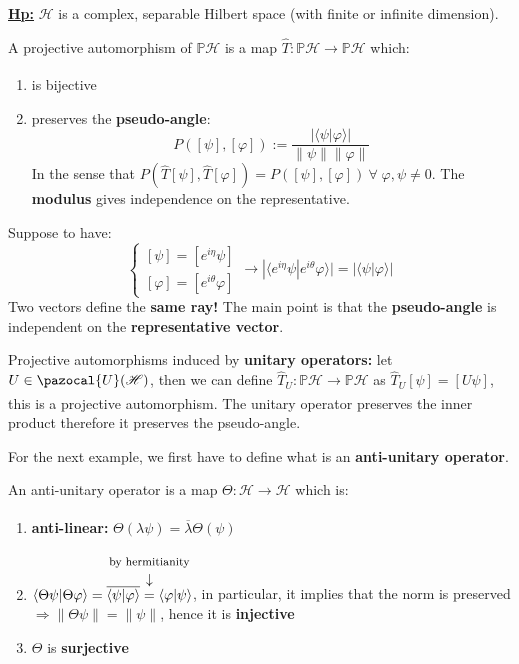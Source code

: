 \documentclass[../main.tex]{subfiles}
\begin{document}
\underline{\textbf{Hp:}} $\mathcal{H}$ is a complex, separable Hilbert space (with finite or infinite dimension).
\begin{definition}
A projective automorphism of $\mathbb{P}\mathcal{H}$ is a map $\hat{T}:\mathbb{P}\mathcal{H}\xrightarrow[]{}\mathbb{P}\mathcal{H}$ which:
\begin{enumerate}
    \item is bijective
    \item preserves the \textbf{pseudo-angle}:
    \[
    P([\psi],[\varphi]):=\frac{|\langle\psi|\varphi\rangle|}{\lVert\psi\rVert\lVert\varphi\rVert}
    \]
    In the sense that $P(\hat{T}[\psi],\hat{T}[\varphi])=P([\psi],[\varphi]) \ \forall\;\varphi,\psi\neq 0$. The \textbf{modulus} gives independence on the representative.
\end{enumerate}
\end{definition}
Suppose to have:
\[
\begin{cases}[\psi]=[e^{i\eta}\psi]\\
[\varphi]=[e^{i\theta}\varphi]
\end{cases}\xrightarrow[]{}|\langle e^{i\eta}\psi|e^{i\theta}\varphi\rangle|=|\langle\psi|\varphi\rangle|
\]
{\selectfont{}\relax}Two vectors define the \textbf{same ray!} The main point is that the \textbf{pseudo-angle} is independent on the \textbf{representative vector}.
\begin{example}
Projective automorphisms induced by \textbf{unitary operators:} let $U\in\pazocal{U}(\mathcal{H})$, then we can define $\hat{T}_U:\mathbb{P}\mathcal{H}\xrightarrow[]{}\mathbb{P}\mathcal{H}$ as {\color{red}$\hat{T}_U[\psi]=[U\psi]$}, this is a projective automorphism. The unitary operator preserves the inner product therefore it preserves the pseudo-angle. 
\end{example}
For the next example, we first have to define what is an \textbf{anti-unitary operator}.
\begin{definition}
An anti-unitary operator is a map $\Theta:\mathcal{H}\xrightarrow[]{}\mathcal{H}$ which is:
\begin{enumerate}
    \item \textbf{anti-linear:} $\Theta(\lambda\psi)=\overline{\lambda}\Theta(\psi)$
    \item $\langle\Theta\psi|\Theta\varphi\rangle=\overline{\langle\psi|\varphi\rangle}\overset{\mathclap{\tikz \node {$\downarrow$} node [above=1.25ex] {\footnotesize by hermitianity};}}{=}\langle\varphi|\psi\rangle$, in particular, it implies that the norm is preserved $\Rightarrow\lVert\Theta\psi\rVert=\lVert\psi\rVert$, hence it is \textbf{injective}
    \item $\Theta$ is \textbf{surjective} 
\end{enumerate}
\end{definition}
\end{document}
